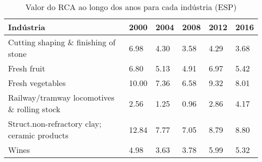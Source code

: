 \begin{table}
\centering
\caption{Valor do RCA ao longo dos anos para cada indústria (ESP)}
\label{tab:ex3-tempo-ESP}
\begin{tabular}{p{6cm}p{1.5cm}p{1.5cm}p{1.5cm}p{1.5cm}p{1.5cm}}
\toprule
                                   Indústria &  2000 & 2004 & 2008 & 2012 & 2016 \\
\midrule
        Cutting shaping \& finishing of stone &  6.98 & 4.30 & 3.58 & 4.29 & 3.68 \\
                                 Fresh fruit &  6.80 & 5.13 & 4.91 & 6.97 & 5.42 \\
                            Fresh vegetables & 10.00 & 7.36 & 6.58 & 9.32 & 8.01 \\
 Railway/tramway locomotives \& rolling stock &  2.56 & 1.25 & 0.96 & 2.86 & 4.17 \\
Struct.non-refractory clay; ceramic products & 12.84 & 7.77 & 7.05 & 8.79 & 8.80 \\
                                       Wines &  4.98 & 3.63 & 3.78 & 5.99 & 5.32 \\
\bottomrule
\end{tabular}
\end{table}
